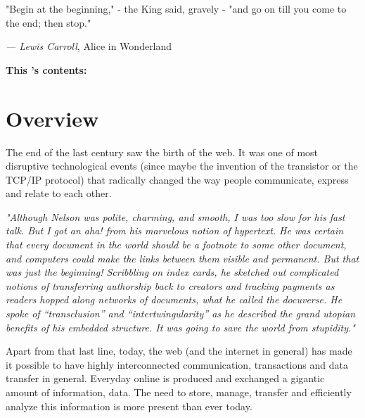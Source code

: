 \begin{figure}[H]%
		\label{fig:\chaptername\thechapter}%
\end{figure}

\vspace*{-3.45cm}
\epigraph{"Begin at the beginning," - the King said, gravely - "and go on till you come to the end; then stop."}{\textit{--- Lewis Carroll}, Alice in Wonderland}

\noindent \large{\textbf{This {\MakeLowercase{\chaptername}}'s contents:}}
\vspace*{-0.65cm}
\minitoc \mtcskip \minilof
\vspace*{-1cm}
\section{Overview} \label{section:Introduction/Overview}
The end of the last century saw the birth of the web.
It was one of most disruptive technological events (since maybe the invention of the transistor or the \acrshort{TCP}/\acrshort{IP} protocol) that radically changed the way people communicate, express and relate to each other.
\begin{quoting}[
	begintext={},
	endtext={\sfcite{WiredArticleWeAretheWeb2005}}
]
	\textit{
		"Although Nelson was polite, charming, and smooth, I was too slow for his fast talk. But I got an aha! from his marvelous notion of hypertext. He was certain that every document in the world should be a footnote to some other document, and computers could make the links between them visible and permanent. But that was just the beginning! Scribbling on index cards, he sketched out complicated notions of transferring authorship back to creators and tracking payments as readers hopped along networks of documents, what he called the docuverse. He spoke of “transclusion” and “intertwingularity” as he described the grand utopian benefits of his embedded structure. It was going to save the world from stupidity."
	}
\end{quoting}
Apart from that last line, today, the web (and the internet in general) has made it possible to have highly interconnected communication, \glspl{transaction} and data transfer in general.
Everyday online is produced and exchanged a gigantic amount of information, data.
The need to store, manage, transfer and efficiently analyze this information is more present than ever today.
\medskip

